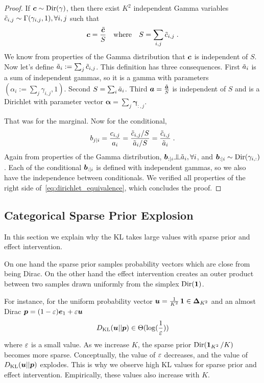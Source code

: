 \begin{subappendices}
\begin{proof}
If ${\bm{c}} \sim \mathrm{Dir}(\gamma)$, then there exist $K^2$ independent Gamma variables $\tilde {{c}}_{i,j} \sim \Gamma(\gamma_{i,j}, 1), \forall i,j$ such that
\begin{align}
    {\bm{c}} = \frac{\tilde {{\bm{c}}}}{S} \quad \text{where} \quad S = \sum_{i,j} \tilde {{c}}_{i,j} \; .
\end{align}
We know from properties of the Gamma distribution that ${\bm{c}}$ is independent of $S$.
Now let's define $\tilde {{a}}_i := \sum_j \tilde {{c}}_{i,j}$.  This definition has three consequences. 
First $\tilde {{a}}_i$ is a sum of independent gammas, so it is a gamma with parameters $(\alpha_i := \sum_j \gamma_{i,j}, 1)$. 
Second $S= \sum_i \tilde {{a}}_i$.
Third ${\bm{a}} = \frac{\tilde {{\bm{a}}}}{S}$ is independent of $S$ and is a Dirichlet with parameter vector $\bm \alpha = \sum_j \bm \gamma_{:,j}$.

That was for the marginal. Now for the conditional, 
\begin{align}
   {b}_{j|i} = \frac{{c}_{i,j}}{{a}_i} 
   = \frac{\tilde {{c}}_{i,j} /S}{\tilde {{a}}_i /S} 
   = \frac{\tilde {{c}}_{i,j}}{ \tilde {{a}}_i}  \; .
\end{align}
Again from properties of the Gamma distribution, $\vb_{:|i} \indep \tilde \eva_i, \forall i$, and ${\bm{b}}_{:|i} \sim \mathrm{Dir}(\gamma_{i,:})$. Each of the conditional ${\bm{b}}_{:|i}$ is defined with independent gammas, so we also have the independence between conditionals.
We verified all properties of the right side of~\eqref{eq:dirichlet_equivalence}, which concludes the proof.
\end{proof}


\subsection{Categorical Sparse Prior Explosion}
\label{apdx:cat_sparse_explosion}

In this section we explain why the KL takes large values with sparse prior and effect intervention. 

On one hand the sparse prior samples probability vectors which are close from being Dirac. 
On the other hand the effect intervention creates an outer product between two samples drawn uniformly from the simplex $\mathrm{Dir}(\operatorname{\mathbf{1}})$. 

For instance, for the uniform probability vector ${\bm{u}} = \frac{1}{K^2} \operatorname{\mathbf{1}} \in \bm{\Delta}_{K^2}$ and an almost Dirac ${\bm{p}} = (1-{\varepsilon}){\bm{e}}_1 + {\varepsilon} {\bm{u}}$
\begin{align*}
    D_{\mathrm{KL}}({\bm{u}} || {\bm{p}})
    \in \Theta(\log(\frac{1}{{\varepsilon}}))
\end{align*}
where ${\varepsilon}$ is a small value.
As we increase $K$, the sparse prior $\mathrm{Dir}(\operatorname{\mathbf{1}}_{K^2}/ K)$ becomes more sparse.
Conceptually, the value of ${\varepsilon}$ decreases, and the value of $D_{\mathrm{KL}}({\bm{u}} || {\bm{p}})$ explodes.
This is why we observe high KL values for sparse prior and effect intervention. Empirically, these values also increase with $K$.


\end{subappendices}
